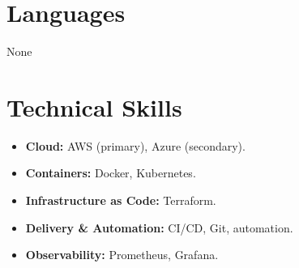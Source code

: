 \documentclass[11pt,a4paper]{article}
\newif\ifshowprojects
\newcommand{\entry}[4]{%
  \Needspace{4\baselineskip}%
  \textbf{#1}\hfill #2\par
  \textit{#3}\hfill \textit{#4}\par
}
\begin{document}
\section{Languages}
None

\section{Technical Skills}
\begin{itemize}
  \item \textbf{Cloud:} AWS (primary), Azure (secondary).
  \item \textbf{Containers:} Docker, Kubernetes.
  \item \textbf{Infrastructure as Code:} Terraform.
  \item \textbf{Delivery \& Automation:} CI/CD, Git, automation.
  \item \textbf{Observability:} Prometheus, Grafana.
\end{itemize}

\ifshowprojects
\section{Projects}
None
\fi
\end{document}
